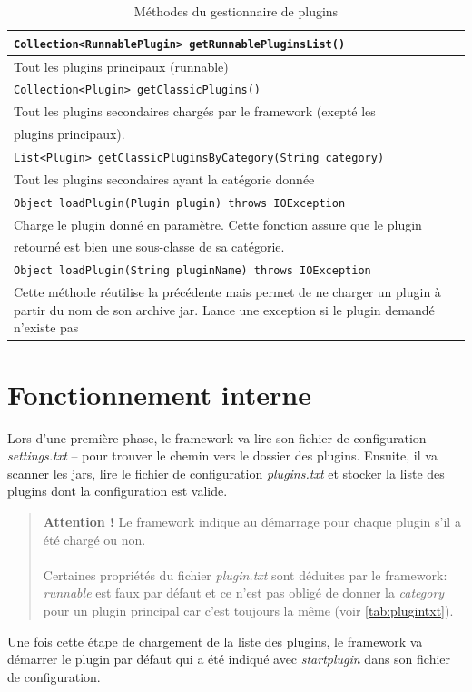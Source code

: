 \documentclass[12pt,a4paper]{article}
\begin{document}
\begin{table}[h]
	\begin{tabular}{|l|}

		\hline
		\texttt{Collection<RunnablePlugin> getRunnablePluginsList()}\\
		\hline
		Tout les plugins principaux (runnable)\\
		\hline

		\hline
		\texttt{Collection<Plugin> getClassicPlugins()}\\
		\hline
		Tout les plugins secondaires chargés par le framework (exepté les \\
		plugins	principaux).\\
		\hline
			
		\hline
		\texttt{List<Plugin> getClassicPluginsByCategory(String category)}\\
		\hline
		Tout les plugins secondaires ayant la catégorie donnée\\
		\hline			
			
		\hline
		\texttt{Object loadPlugin(Plugin plugin) throws IOException}\\
		\hline
		Charge le plugin donné en paramètre. Cette fonction assure que le plugin\\
		retourné est bien une sous-classe de sa catégorie.\\
		\hline
		
		\hline
		\texttt{Object loadPlugin(String pluginName) throws IOException}\\
		\hline
		Cette méthode réutilise la précédente mais permet de ne charger un plugin
		à partir du nom de son archive jar. Lance une exception si le plugin demandé
		n'existe pas\\
		\hline		
	\end{tabular}	
\caption{Méthodes du gestionnaire de plugins}
\end{table}

\section{Fonctionnement interne}
Lors d'une première phase, le framework va lire son fichier de configuration -- 
\emph{settings.txt} -- pour trouver le chemin vers le dossier des plugins. 
Ensuite, il va scanner les jars, lire le fichier de configuration 
\emph{plugins.txt} et stocker la liste des plugins dont la configuration est valide.

\begin{quote}
	\textbf{Attention !} Le framework indique au démarrage pour chaque plugin 
	s'il a été chargé ou non. 
	\\\\
	Certaines propriétés du fichier \emph{plugin.txt} sont déduites par le 
	framework: \emph{runnable} est faux par défaut et ce n'est pas obligé de 
	donner la \emph{category} pour un plugin principal car c'est toujours la 
	même (voir \ref{tab:plugintxt}).
\end{quote}

Une fois cette étape de chargement de la liste des plugins, le framework va 
démarrer le plugin par défaut qui a été indiqué avec \emph{startplugin} dans son 
fichier de configuration.
\end{document}
